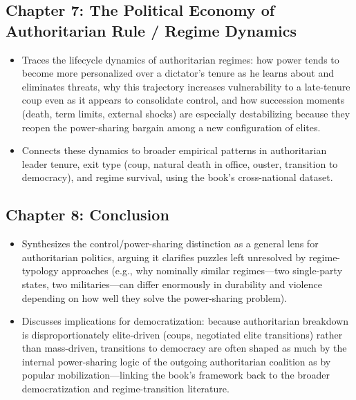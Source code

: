 \documentclass[12pt]{article}
\begin{document}
\subsection*{Chapter 7: The Political Economy of Authoritarian Rule / Regime Dynamics}

\begin{itemize}[leftmargin=*, itemsep=4pt]
    \item Traces the lifecycle dynamics of authoritarian regimes: how power tends to become more personalized over a dictator's tenure as he learns about and eliminates threats, why this trajectory increases vulnerability to a late-tenure coup even as it appears to consolidate control, and how succession moments (death, term limits, external shocks) are especially destabilizing because they reopen the power-sharing bargain among a new configuration of elites.
    \item Connects these dynamics to broader empirical patterns in authoritarian leader tenure, exit type (coup, natural death in office, ouster, transition to democracy), and regime survival, using the book's cross-national dataset.
\end{itemize}

\subsection*{Chapter 8: Conclusion}

\begin{itemize}[leftmargin=*, itemsep=4pt]
    \item Synthesizes the control/power-sharing distinction as a general lens for authoritarian politics, arguing it clarifies puzzles left unresolved by regime-typology approaches (e.g., why nominally similar regimes---two single-party states, two militaries---can differ enormously in durability and violence depending on how well they solve the power-sharing problem).
    \item Discusses implications for democratization: because authoritarian breakdown is disproportionately elite-driven (coups, negotiated elite transitions) rather than mass-driven, transitions to democracy are often shaped as much by the internal power-sharing logic of the outgoing authoritarian coalition as by popular mobilization---linking the book's framework back to the broader democratization and regime-transition literature.
\end{itemize}

\end{document}
